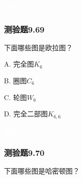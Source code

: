 \documentclass[UTF8, heading=true]{ctexart}
\begin{document}
\textcolor{white}{答案：D}

\subsubsection{测验题9.69}

下面哪些图是欧拉图？

A. 完全图$K_6$

B. 圈图$C_6$

C. 轮图$W_6$

D. 完全二部图$K_{6,6}$

\textcolor{white}{答案：BD}

\subsubsection{测验题9.70}

下面哪些图是哈密顿图？
\end{document}
